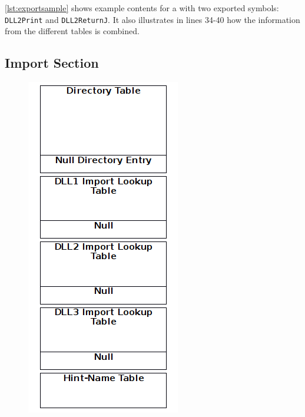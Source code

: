 \autoref{lst:exportsample} shows example contents for a \DLL{} with two exported symbols: \texttt{DLL2Print} and \texttt{DLL2ReturnJ}. It also illustrates in lines 34-40 how the information from the different tables is combined.



\subsection*{Import Section}

\begin{figure}
\centering
\includegraphics[width=.98\textwidth, height=.60\textheight,keepaspectratio]{graphics/importsection}

\end{figure}
